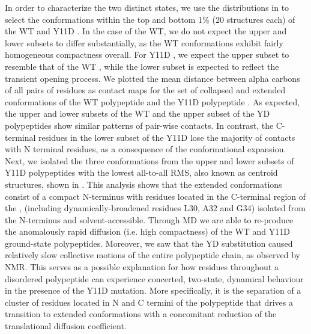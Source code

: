 In order to characterize the two distinct	 states, we use the \diffusion distributions in  to select the conformations within the top and bottom 1\% (20 structures each) of the WT \gct and Y11D \gct. In the case of the WT, we do not expect the upper and lower \diffusion subsets to differ substantially, as the WT \gct conformations exhibit fairly homogeneous compactness overall. For Y11D \gct, we expect the upper \diffusion subset to resemble that of the WT \gct, while the lower \diffusion subset is expected to reflect the transient opening process. We plotted the mean distance between alpha carbons of all pairs of residues as contact maps for the set of collapsed  and extended conformations of the WT \gct polypeptide  and the Y11D \gct polypeptide .   As expected, the upper and lower \diffusion subsets of the WT \gct and the upper \diffusion subset of the YD \gct polypeptides show similar patterns of pair-wise contacts.  In contrast, the C-terminal residues in the lower \diffusion subset of the Y11D \gct lose the majority of contacts with N terminal residues, as a consequence of the conformational expansion. Next, we isolated the three conformations from the upper and lower \diffusion subsets of  Y11D \gct polypeptides with the lowest all-to-all RMS, also known as centroid structures, shown in . This analysis shows that the extended conformations consist of a compact N-terminus with residues located in the C-terminal region of the \gct, (including dynamically-broadened residues L30, A32 and G34) isolated from the N-terminus and solvent-accessible. Through MD we are able to re-produce the anomalously rapid diffusion (i.e. high compactness) of the WT and Y11D ground-state \gct polypeptides. Moreover, we saw that the YD substitution caused relatively slow collective motions of the entire polypeptide chain, as observed by NMR. This serves as a possible explanation for how residues throughout a disordered polypeptide can experience concerted, two-state, dynamical behaviour in the presence of the Y11D mutation. More specifically, it is the separation of a cluster of residues located in N and C termini of the \gct polypeptide that drives a transition to extended conformations with a concomitant  reduction of the translational diffusion coefficient.


